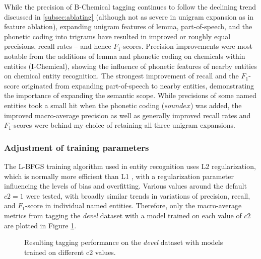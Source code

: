 \documentclass[10pt, oneside]{article}
\begin{document}
While the precision of B-Chemical tagging continues to follow the declining trend discussed in \ref{subsec:ablating} (although not as severe in unigram expansion as in feature ablation), expanding unigram features of lemma, part-of-speech, and the phonetic coding into trigrams have resulted in improved or roughly equal precisions, recall rates -- and hence $F_1$-scores. Precision improvements were most notable from the additions of lemma and phonetic coding on chemicals within entities (I-Chemical), showing the influence of phonetic features of nearby entities on chemical entity recognition. The strongest improvement of recall and the $F_1$-score originated from expanding part-of-speech to nearby entities, demonstrating the importance of expanding the semantic scope. While precisions of some named entities took a small hit when the phonetic coding ($soundex$) was added, the improved macro-average precision as well as generally improved recall rates and $F_1$-scores were behind my choice of retaining all three unigram expansions.

\subsubsection{Adjustment of training parameters}

The L-BFGS training algorithm used in entity recognition uses L2 regularization, which is normally more efficient than L1 \cite{cortes20092}, with a regularization parameter influencing the levels of bias and overfitting. Various values around the default $c2 = 1$ were tested, with broadly similar trends in variations of precision, recall, and $F_1$-score in individual named entities. Therefore, only the macro-average metrics from tagging the \emph{devel} dataset with a model trained on each value of $c2$ are plotted in Figure \ref{fig:c2}.

\begin{figure}[h]
\begin{center}
\caption{\label{fig:c2} Resulting tagging performance on the \emph{devel} dataset with models trained on different c2 values.}
\end{center}
\end{figure}
\end{document}
